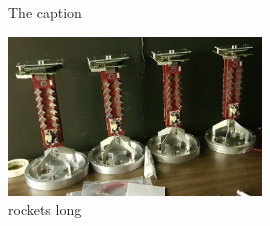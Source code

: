 \begin{figure} %
    \centering
    \quad
    \caption[The caption]
    {The caption}
\end{figure}

\begin{figure} %
    \includegraphics[width=0.6\textwidth]{diagrams/5-daq/rockets.jpg}
    \caption[rockets short]
    {rockets long}
    \label{fig:rockets}
\end{figure}

